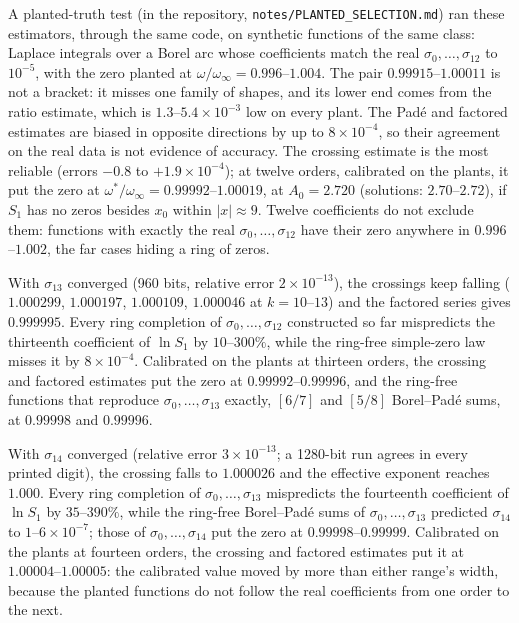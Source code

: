 \documentclass{amsart}
\numberwithin{equation}{section}
\theoremstyle{plain}
\theoremstyle{definition}
\theoremstyle{remark}
\newcommand{\winf}{\omega_\infty}
\newcommand{\repo}[1]{\texttt{#1}}
\begin{document}
A planted-truth test (in the repository, \repo{notes/PLANTED\_SELECTION.md}) ran these estimators, through the same code, on synthetic
functions of the same class: Laplace integrals over a Borel arc whose coefficients match the real $\sigma_0,\dots,\sigma_{12}$
to $10^{-5}$, with the zero planted at $\omega/\winf = 0.996$--$1.004$. The pair $0.99915$--$1.00011$ is not a bracket: it
misses one family of shapes, and its lower end comes from the ratio estimate, which is $1.3$--$5.4\times10^{-3}$ low on every
plant. The Pad\'e and factored estimates are biased in opposite directions by up to $8\times10^{-4}$, so their agreement on
the real data is not evidence of accuracy. The crossing estimate is the most reliable (errors $-0.8$ to $+1.9\times10^{-4}$);
at twelve orders, calibrated on the plants, it put the zero at $\omega^*/\winf = 0.99992$--$1.00019$, at
$A_0 = 2.720$ (solutions: $2.70$--$2.72$), if $S_1$ has no zeros besides $x_0$ within $|x| \approx 9$. Twelve coefficients
do not exclude them: functions with exactly the real $\sigma_0,\dots,\sigma_{12}$ have their zero anywhere in
$0.996$--$1.002$, the far cases hiding a ring of zeros.

With $\sigma_{13}$ converged (960 bits, relative error $2\times10^{-13}$), the crossings keep falling ($1.000299$,
$1.000197$, $1.000109$, $1.000046$ at $k = 10$--$13$) and the factored series gives $0.999995$. Every ring completion of
$\sigma_0,\dots,\sigma_{12}$ constructed so far mispredicts the thirteenth coefficient of $\ln S_1$ by $10$--$300\%$,
while the ring-free simple-zero law misses it by $8\times10^{-4}$. Calibrated on the plants at thirteen orders, the
crossing and factored estimates put the zero at $0.99992$--$0.99996$, and the ring-free functions that reproduce
$\sigma_0,\dots,\sigma_{13}$ exactly, $[6/7]$ and $[5/8]$ Borel--Pad\'e sums, at $0.99998$ and $0.99996$.

With $\sigma_{14}$ converged (relative error $3\times10^{-13}$; a 1280-bit run agrees in every printed digit), the
crossing falls to $1.000026$ and the effective exponent reaches $1.000$. Every ring completion of
$\sigma_0,\dots,\sigma_{13}$ mispredicts the fourteenth coefficient of $\ln S_1$ by $35$--$390\%$, while the ring-free
Borel--Pad\'e sums of $\sigma_0,\dots,\sigma_{13}$ predicted $\sigma_{14}$ to $1$--$6\times10^{-7}$; those of
$\sigma_0,\dots,\sigma_{14}$ put the zero at $0.99998$--$0.99999$. Calibrated on the plants at fourteen orders, the
crossing and factored estimates put it at $1.00004$--$1.00005$: the calibrated value moved by more than either range's
width, because the planted functions do not follow the real coefficients from one order to the next.
\end{document}
